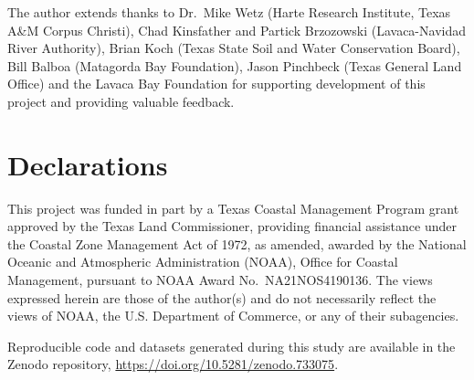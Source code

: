 \documentclass[sn-basic,referee,lineno,pdflatex]{sn-jnl}
\begin{document}
\backmatter


The author extends thanks to Dr.~Mike Wetz (Harte Research Institute,
Texas A\&M Corpus Christi), Chad Kinsfather and Partick Brzozowski
(Lavaca-Navidad River Authority), Brian Koch (Texas State Soil and Water
Conservation Board), Bill Balboa (Matagorda Bay Foundation), Jason
Pinchbeck (Texas General Land Office) and the Lavaca Bay Foundation for
supporting development of this project and providing valuable feedback.

\hypertarget{declarations}{%
\section*{Declarations}\label{declarations}}


This project was funded in part by a Texas Coastal Management Program
grant approved by the Texas Land Commissioner, providing financial
assistance under the Coastal Zone Management Act of 1972, as amended,
awarded by the National Oceanic and Atmospheric Administration (NOAA),
Office for Coastal Management, pursuant to NOAA Award
No.~NA21NOS4190136. The views expressed herein are those of the
author(s) and do not necessarily reflect the views of NOAA, the U.S.
Department of Commerce, or any of their subagencies.


Reproducible code and datasets generated during this study are available
in the Zenodo repository, \url{https://doi.org/10.5281/zenodo.733075}.


\end{document}
